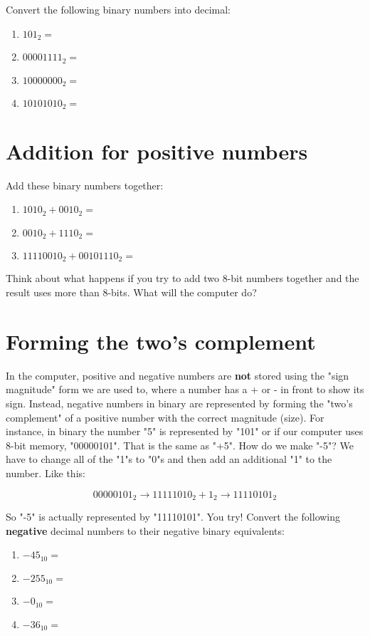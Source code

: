 \documentclass[a4paper,12pt]{article} %
\begin{document}
Convert the following binary numbers into decimal:

\begin{enumerate}[resume]
\item $101_{2} = $
\item $00001111_{2} = $
\item $10000000_{2} = $
\item $10101010_{2} = $
\end{enumerate}

\section{Addition for positive numbers}

\noindent
Add these binary numbers together:

\begin{enumerate}[resume]
\item $1010_{2} + 0010_{2} = $
\item $0010_{2} + 1110_{2} = $
\item $11110010_{2} + 00101110_{2} = $
\end{enumerate}

\noindent
Think about what happens if you try to add two 8-bit numbers together and the result uses more than 8-bits. What will the computer do? 

\section{Forming the two's complement}

In the computer, positive and negative numbers are \textbf{not} stored using the "sign magnitude" form we are used to, where a number has a + or - in front to show its sign. Instead, negative numbers in binary are represented by forming the "two's complement" of a positive number with the correct magnitude (size). For instance, in binary the number "5" is represented by "101" or if our computer uses 8-bit memory, "00000101". That is the same as "+5". How do we make "-5"? We have to change all of the "1"s to "0"s and then add an additional "1" to the number. Like this:

$$00000101_{2} \rightarrow 11111010_{2} + 1_{2} \rightarrow 11110101_{2}$$

\noindent
So "-5" is actually represented by "11110101". You try! Convert the following \textbf{negative} decimal numbers to their negative binary equivalents:

\begin{enumerate}[resume]
\item $-45_{10} = $ 
\item $-255_{10} = $ 
\item $-0_{10} = $
\item $-36_{10} = $
\end{enumerate}
\end{document}
